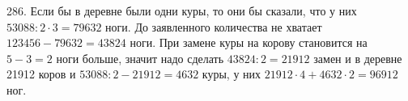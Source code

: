 286. Если бы в деревне были одни куры, то они бы сказали, что у них $53088:2\cdot3=79632$ ноги. До заявленного количества не хватает $123456-79632=43824$ ноги. При замене куры на корову становится на $5-3=2$ ноги больше, значит надо сделать $43824:2=21912$ замен и в деревне 21912 коров и $53088:2-21912=4632$ куры, у них $21912\cdot4+4632\cdot2=96912$ ног.\\
